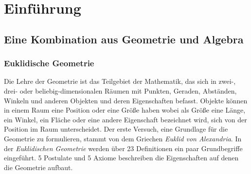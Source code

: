 \chapter{Einführung}

\section{Eine Kombination aus Geometrie und Algebra}

\subsection{Euklidische Geometrie}

Die Lehre der Geometrie ist das Teilgebiet der Mathematik, das sich in zwei-, drei- oder beliebig-dimensionalen Räumen mit Punkten, Geraden, Abständen, Winkeln und anderen Objekten und deren Eigenschaften befasst. Objekte können in einem Raum eine Position oder eine Größe haben wobei als Größe eine Länge, ein Winkel, ein Fläche oder eine andere Eigenschaft bezeichnet wird, sich von der Position im Raum unterscheidet. Der erste Versuch, eine Grundlage für die Geometrie zu formulieren, stammt von dem Griechen \textit{Euklid von Alexandria}. In der \textit{Euklidischen Geometrie} werden über 23 Definitionen ein paar Grundbegriffe eingeführt. 5 Postulate und 5 Axiome beschreiben die Eigenschaften auf denen die Geometrie aufbaut.

